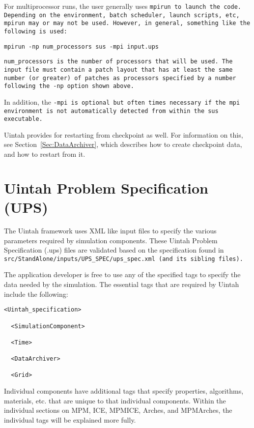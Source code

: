 For multiprocessor runs, the user generally uses \tt mpirun
\normalfont to launch the code.  Depending on the environment, batch
scheduler, launch scripts, etc, \tt mpirun \normalfont may or may not
be used.  However, in general, something like the following is used:
\begin{Verbatim}[fontsize=\footnotesize]
  mpirun -np num_processors sus -mpi input.ups
\end{Verbatim}

\tt num\_processors \normalfont is the number of processors that will
be used.  The input file must contain a patch layout that has at least
the same number (or greater) of patches as processors specified by a
number following the -np option shown above.

In addition, the \tt -mpi \normalfont is optional but often times
necessary if the mpi environment is not automatically detected from
within the sus executable.

Uintah provides for restarting from checkpoint as well.  For information on
this, see Section~\ref{Sec:DataArchiver}, which describes how to create
checkpoint data, and how to restart from it.

\section{Uintah Problem Specification (UPS)} \label{Sec:UPS}

The Uintah framework uses XML like input files to specify the various
parameters required by simulation components.  These Uintah Problem
Specification (.ups) files are validated based on the specification
found in \tt src/StandAlone/inputs/UPS\_SPEC/ups\_spec.xml \normalfont
(and its sibling files).  

The application developer is free to use any of the specified tags to
specify the data needed by the simulation.  The essential tags that
are required by Uintah include the following:

\begin{Verbatim}[fontsize=\footnotesize]
  <Uintah_specification>

  <SimulationComponent>

  <Time>

  <DataArchiver>

  <Grid>
\end{Verbatim}


Individual components have additional tags that specify properties,
algorithms, materials, etc. that are unique to that individual
components.  Within the individual sections on MPM, ICE, MPMICE,
Arches, and MPMArches, the individual tags will be explained more
fully.

